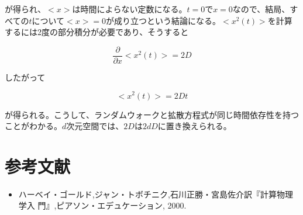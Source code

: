 \documentclass{jsarticle}
\begin{document}
        が得られ、$<x>$は時間によらない定数になる。$t=0$で$x=0$なので、結局、すべての$t$について$<x>=0$が成り立つという結論になる。$<x^{2}(t)>$を計算するには2度の部分積分が必要であり、そうすると
        
        \begin{equation}
            \frac{\partial}{\partial x}<x^{2}(t)> = 2D
        \end{equation}
        
        したがって
        
        \begin{equation}
            <x^{2}(t)> = 2Dt
        \end{equation}
        
        が得られる。こうして、ランダムウォークと拡散方程式が同じ時間依存性を持つことがわかる。$d$次元空間では、$2D$は$2dD$に置き換えられる。
        
    \section{参考文献}
    
        \begin{itemize}
            \item ハーベイ・ゴールド,ジャン・トボチニク,石川正勝・宮島佐介訳『計算物理学入
            門』,ピアソン・エデュケーション, 2000.
        \end{itemize}
\end{document}
